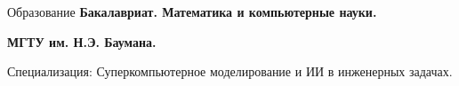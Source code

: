 \begin{rubric}{Образование}
%
	\textbf{Бакалавриат. Математика и компьютерные науки.} 

	\textbf{МГТУ им. Н.Э. Баумана.} 

	Специализация: Суперкомпьютерное моделирование и ИИ в инженерных задачах.
\end{rubric}
